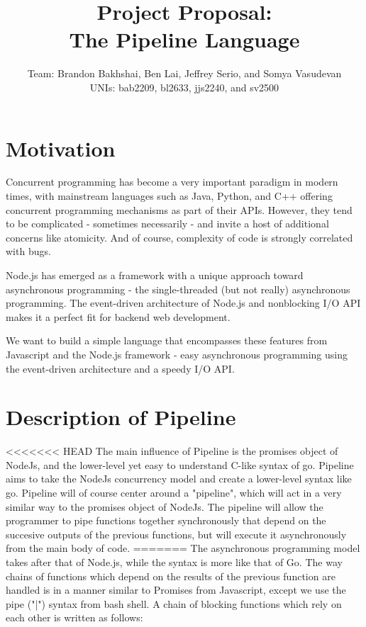 \documentclass[11pt]{article}
\title{\textbf{Project Proposal:\\ The Pipeline Language}}
\author{Team: Brandon Bakhshai, Ben Lai, Jeffrey Serio, and Somya Vasudevan \\ UNIs: bab2209, bl2633, jjs2240, and sv2500}
\begin{document}
\maketitle
\thispagestyle{empty}
\renewcommand{\thesubsubsection}{\thesubsection.\alph{subsubsection}.}


\section{Motivation}
\hspace{0.5cm} Concurrent programming has become a very important paradigm in modern times, with mainstream languages such as Java, Python, and C++ offering concurrent programming mechanisms as part of their APIs. However, they tend to be complicated - sometimes necessarily - and invite a host of additional concerns like atomicity. And of course, complexity of code is strongly correlated with bugs.

Node.js has emerged as a framework with a unique approach toward asynchronous programming - the single-threaded (but not really) asynchronous programming. The event-driven architecture of Node.js and nonblocking I/O API makes it a perfect fit for backend web development.

We want to build a simple language that encompasses these features from Javascript and the Node.js framework - easy asynchronous programming using the event-driven architecture and a speedy I/O API.

\section{Description of Pipeline}
<<<<<<< HEAD
\hspace{0.5cm} The main influence of Pipeline is the promises object of NodeJs, and the lower-level yet easy to understand C-like syntax of go. Pipeline aims to take the NodeJs concurrency model and create a lower-level syntax like go. Pipeline will of course center around a "pipeline", which will act in a very similar way to the promises object of NodeJs. The pipeline will allow the programmer to pipe functions together synchronously that depend on the succesive outputs of the previous functions, but will execute it asynchronously from the main body of code.
=======
\hspace{0.5cm} The asynchronous programming model takes after that of Node.js, while the syntax is more like that of Go. The way chains of functions which depend on the results of the previous function are handled is in a manner similar to Promises from Javascript, except we use the pipe ("|") syntax from bash shell. A chain of blocking functions which rely on each other is written as follows:
\end{document}
